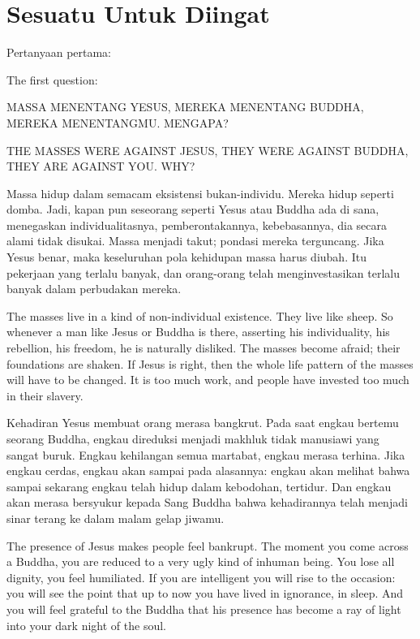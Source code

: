 \chapter{Sesuatu Untuk Diingat}

\bahasa
Pertanyaan pertama:

\english
The first question:

\bahasa
MASSA MENENTANG YESUS, MEREKA MENENTANG BUDDHA, MEREKA MENENTANGMU. MENGAPA?

\english
THE MASSES WERE AGAINST JESUS, THEY WERE AGAINST BUDDHA, THEY ARE AGAINST YOU. WHY?

\bahasa
Massa hidup dalam semacam eksistensi bukan-individu. Mereka hidup seperti domba. Jadi, kapan pun seseorang seperti Yesus atau Buddha ada di sana, menegaskan individualitasnya, pemberontakannya, kebebasannya, dia secara alami tidak disukai. Massa menjadi takut; pondasi mereka terguncang. Jika Yesus benar, maka keseluruhan pola kehidupan massa harus diubah. Itu pekerjaan yang terlalu banyak, dan orang-orang telah menginvestasikan terlalu banyak dalam perbudakan mereka.

\english
The masses live in a kind of non-individual existence. They live like sheep. So whenever a man like Jesus or Buddha is there, asserting his individuality, his rebellion, his freedom, he is naturally disliked. The masses become afraid; their foundations are shaken. If Jesus is right, then the whole life pattern of the masses will have to be changed. It is too much work, and people have invested too much in their slavery.

\bahasa
Kehadiran Yesus membuat orang merasa bangkrut. Pada saat engkau bertemu seorang Buddha, engkau direduksi menjadi makhluk tidak manusiawi yang sangat buruk. Engkau kehilangan semua martabat, engkau merasa terhina. Jika engkau cerdas, engkau akan sampai pada alasannya: engkau akan melihat bahwa sampai sekarang engkau telah hidup dalam kebodohan, tertidur. Dan engkau akan merasa bersyukur kepada Sang Buddha bahwa kehadirannya telah menjadi sinar terang ke dalam malam gelap jiwamu.

\english
The presence of Jesus makes people feel bankrupt. The moment you come across a Buddha, you are reduced to a very ugly kind of inhuman being. You lose all dignity, you feel humiliated. If you are intelligent you will rise to the occasion: you will see the point that up to now you have lived in ignorance, in sleep. And you will feel grateful to the Buddha that his presence has become a ray of light into your dark night of the soul.

